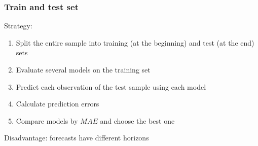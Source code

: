 \begin{frame}
	\frametitle{Train and test set}
	
	Strategy:
	\begin{enumerate}[<+->]
		\item Split the entire sample into \alert{training} (at the beginning) and \alert{test} (at the end) sets
		\item \alert{Evaluate} several models on the training set
		\item \alert{Predict} each observation of the test sample using each model
		\item Calculate prediction \alert{errors}
		\item \alert{Compare} models by $MAE$ and choose the best one
	\end{enumerate}
	
	\pause
	Disadvantage: \alert{forecasts have different horizons}
	
\end{frame}

